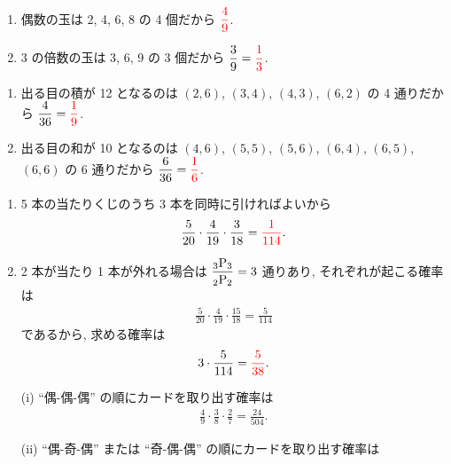 \vspace{\baselineskip}
\check
\begin{qenumerate}
	\item{
		\begin{enumerate}
			\item{
				偶数の玉は 2, 4, 6, 8 の 4 個だから $\textcolor{red}{\dfrac{4}{9}}$.
			}
			\item{
				3 の倍数の玉は 3, 6, 9 の 3 個だから $\dfrac{3}{9} = \textcolor{red}{\dfrac{1}{3}}$.
			}
		\end{enumerate}
	}
	\item{
		\begin{enumerate}
			\item{
				出る目の積が 12 となるのは $(2, 6)$, $(3, 4)$, $(4, 3)$, $(6, 2)$ の 4 通りだから $\dfrac{4}{36} = \textcolor{red}{\dfrac{1}{9}}$.
			}
			\item{
				出る目の和が 10 となるのは $(4, 6)$, $(5, 5)$, $(5, 6)$, $(6, 4)$, $(6, 5)$, $(6, 6)$ の 6 通りだから $\dfrac{6}{36} = \textcolor{red}{\dfrac{1}{6}}$.
			}
		\end{enumerate}
	}
	\item{
		\begin{enumerate}
			\item{
				5 本の当たりくじのうち 3 本を同時に引ければよいから
				\begin{align}
					\frac{5}{20}\cdot\frac{4}{19}\cdot\frac{3}{18} = \textcolor{red}{\frac{1}{114}}.
				\end{align}
			}
			\item{
				2 本が当たり 1 本が外れる場合は $\dfrac{{{}_{3}\mathrm{P}_{3}}}{{{}_{2}\mathrm{P}_{2}}} = 3$ 通りあり, それぞれが起こる確率は
				\begin{align}
					\frac{5}{20}\cdot\frac{4}{19}\cdot\frac{15}{18} = \frac{5}{114}
				\end{align}
				であるから, 求める確率は
				\begin{align}
					3\cdot\frac{5}{114} = \textcolor{red}{\frac{5}{38}}.
				\end{align}
			}
		\end{enumerate}
	}
	\item{
		\begin{enumerate}
			\item[(i)]{
				``偶-偶-偶'' の順にカードを取り出す確率は
				\begin{align}
					\frac{4}{9}\cdot\frac{3}{8}\cdot\frac{2}{7} = \frac{24}{504}.
				\end{align}
			}
			\item[(ii)]{
				``偶-奇-偶'' または ``奇-偶-偶'' の順にカードを取り出す確率は
}
\end{enumerate}}
\end{qenumerate}
